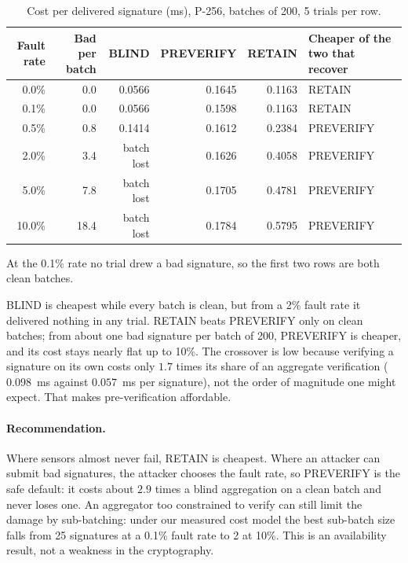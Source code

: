 \begin{table}[ht]
\centering\small
\caption{Cost per delivered signature (ms), P-256, batches of 200, 5 trials per row.}\label{tab:agg}
\begin{tabular}{rrrrrl}
\toprule
Fault rate & Bad per batch & BLIND & PREVERIFY & RETAIN & Cheaper of the two that recover \\
\midrule
0.0\% & 0.0 & 0.0566 & 0.1645 & 0.1163 & RETAIN \\
0.1\% & 0.0 & 0.0566 & 0.1598 & 0.1163 & RETAIN \\
0.5\% & 0.8 & 0.1414 & 0.1612 & 0.2384 & PREVERIFY \\
2.0\% & 3.4 & batch lost & 0.1626 & 0.4058 & PREVERIFY \\
5.0\% & 7.8 & batch lost & 0.1705 & 0.4781 & PREVERIFY \\
10.0\% & 18.4 & batch lost & 0.1784 & 0.5795 & PREVERIFY \\
\bottomrule
\end{tabular}

\smallskip
\footnotesize At the 0.1\% rate no trial drew a bad signature, so the first two rows are both clean batches.
\end{table}

BLIND is cheapest while every batch is clean, but from a 2\% fault rate it delivered nothing in any trial.
RETAIN beats PREVERIFY only on clean batches; from about one bad signature per batch of 200, PREVERIFY is
cheaper, and its cost stays nearly flat up to 10\%. The crossover is low because verifying a signature on
its own costs only $1.7$ times its share of an aggregate verification ($0.098$~ms against $0.057$~ms per
signature), not the order of magnitude one might expect. That makes pre-verification affordable.

\paragraph{Recommendation.} Where sensors almost never fail, RETAIN is cheapest. Where an attacker can
submit bad signatures, the attacker chooses the fault rate, so PREVERIFY is the safe default: it costs
about $2.9$ times a blind aggregation on a clean batch and never loses one. An aggregator too constrained
to verify can still limit the damage by sub-batching: under our measured cost model the best sub-batch
size falls from 25 signatures at a 0.1\% fault rate to 2 at 10\%. This is an availability result, not a weakness in the
cryptography.
